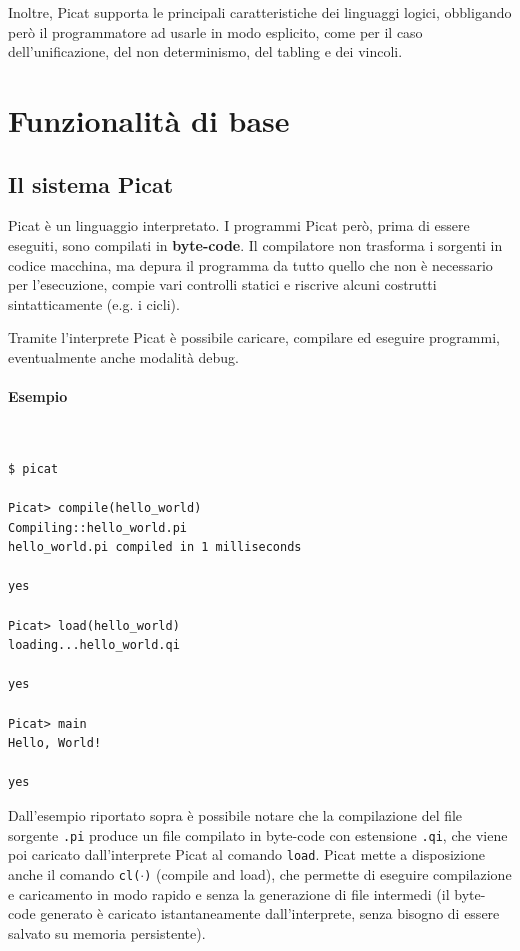 \documentclass[12pt,a4paper,openright]{book} %
\begin{document}
Inoltre, Picat supporta le principali caratteristiche dei linguaggi
logici, obbligando però il programmatore ad usarle in modo esplicito,
come per il caso dell'unificazione, del non determinismo, del tabling
e dei vincoli.

\section{Funzionalità di base}
\label{sec:picat_base}

\subsection{Il sistema Picat}
\label{subsec:picat_base_system}

Picat è un linguaggio interpretato. I programmi Picat però, prima di
essere eseguiti, sono compilati in \textbf{byte-code}. Il compilatore
non trasforma i sorgenti in codice macchina, ma depura il programma da
tutto quello che non è necessario per l'esecuzione, compie vari
controlli statici e riscrive alcuni costrutti sintatticamente (e.g. i
cicli).

Tramite l'interprete Picat è possibile caricare, compilare ed eseguire
programmi, eventualmente anche modalità debug.

\paragraph{Esempio}\
\begin{verbatim}
$ picat 

Picat> compile(hello_world)
Compiling::hello_world.pi
hello_world.pi compiled in 1 milliseconds

yes

Picat> load(hello_world)
loading...hello_world.qi

yes

Picat> main
Hello, World!

yes
\end{verbatim}

Dall'esempio riportato sopra è possibile notare che la compilazione
del file sorgente \texttt{.pi} produce un file compilato in byte-code
con estensione \texttt{.qi}, che viene poi caricato dall'interprete
Picat al comando \texttt{load}. Picat mette a disposizione anche il
comando \texttt{cl($\cdot$)} (compile and load), che permette di
eseguire compilazione e caricamento in modo rapido e senza la
generazione di file intermedi (il byte-code generato è caricato
istantaneamente dall'interprete, senza bisogno di essere salvato su
memoria persistente).
\end{document}
